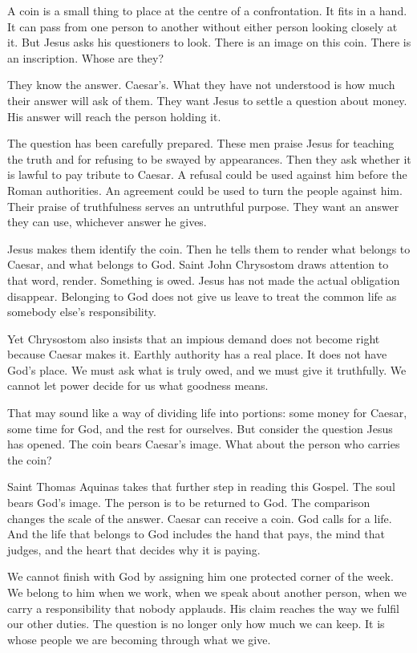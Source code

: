A coin is a small thing to place at the centre of a confrontation. It fits in a hand. It can pass from one person to another without either person looking closely at it. But Jesus asks his questioners to look. There is an image on this coin. There is an inscription. Whose are they?

They know the answer. Caesar's. What they have not understood is how much their answer will ask of them. They want Jesus to settle a question about money. His answer will reach the person holding it.

The question has been carefully prepared. These men praise Jesus for teaching the truth and for refusing to be swayed by appearances. Then they ask whether it is lawful to pay tribute to Caesar. A refusal could be used against him before the Roman authorities. An agreement could be used to turn the people against him. Their praise of truthfulness serves an untruthful purpose. They want an answer they can use, whichever answer he gives.

Jesus makes them identify the coin. Then he tells them to render what belongs to Caesar, and what belongs to God. Saint John Chrysostom draws attention to that word, render. Something is owed. Jesus has not made the actual obligation disappear. Belonging to God does not give us leave to treat the common life as somebody else's responsibility.

Yet Chrysostom also insists that an impious demand does not become right because Caesar makes it. Earthly authority has a real place. It does not have God's place. We must ask what is truly owed, and we must give it truthfully. We cannot let power decide for us what goodness means.

That may sound like a way of dividing life into portions: some money for Caesar, some time for God, and the rest for ourselves. But consider the question Jesus has opened. The coin bears Caesar's image. What about the person who carries the coin?

Saint Thomas Aquinas takes that further step in reading this Gospel. The soul bears God's image. The person is to be returned to God. The comparison changes the scale of the answer. Caesar can receive a coin. God calls for a life. And the life that belongs to God includes the hand that pays, the mind that judges, and the heart that decides why it is paying.

We cannot finish with God by assigning him one protected corner of the week. We belong to him when we work, when we speak about another person, when we carry a responsibility that nobody applauds. His claim reaches the way we fulfil our other duties. The question is no longer only how much we can keep. It is whose people we are becoming through what we give.

